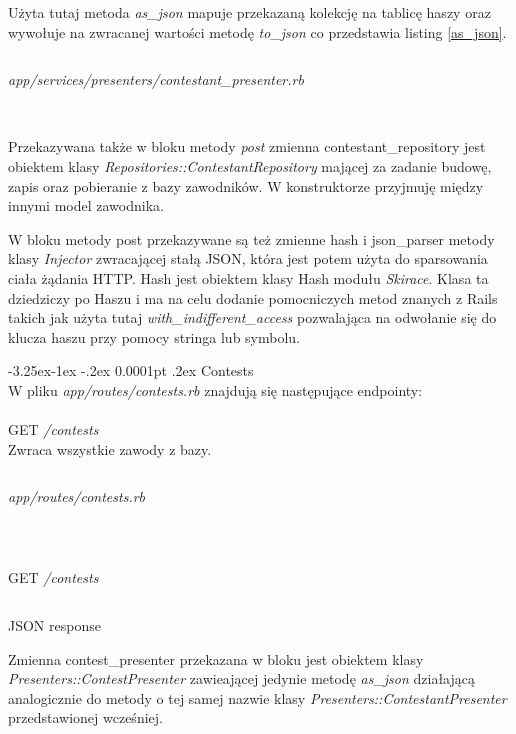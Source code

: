 \documentclass[11pt,a4paper, twoside]{article}
\makeatletter
\renewcommand\subparagraph{\@startsection{subparagraph}{5}{\z@}%
                                     {-3.25ex\@plus -1ex \@minus -.2ex}%
                                     {0.0001pt \@plus .2ex}%
                                     {\normalfont\normalsize\bfseries}}
\makeatother
\begin{document}
Użyta tutaj metoda \emph{as\_json} mapuje przekazaną kolekcję na tablicę haszy oraz wywołuje na zwracanej wartości metodę \emph{to\_json} co przedstawia listing \ref{as_json}.
\begin{listing}
\inputminted{ruby}{./src/contestants_as_json.rb}
\caption{\emph{app/services/presenters/contestant\_presenter.rb}}
$\label{as_json}$
\end{listing}


Przekazywana także w bloku metody \emph{post} zmienna contestant\_repository jest obiektem klasy \emph{Repositories::ContestantRepository} mającej za zadanie budowę, zapis oraz pobieranie z bazy zawodników. W konstruktorze przyjmuję między innymi model zawodnika. %

W bloku metody post przekazywane są też zmienne hash i json\_parser metody klasy \emph{Injector} zwracającej stałą JSON, która jest potem użyta do sparsowania ciała żądania HTTP. Hash jest obiektem klasy Hash modułu \emph{Skirace}. Klasa ta dziedziczy po Haszu i ma na celu dodanie pomocniczych metod znanych z Rails takich jak użyta tutaj \emph{with\_indifferent\_access} pozwalająca na odwołanie się do klucza haszu przy pomocy stringa lub symbolu. 

\clearpage
\subparagraph{Contests} ~\\
W pliku \emph{app/routes/contests.rb} znajdują się następujące endpointy:
\\\\
GET \emph{/contests}
\\
\noindent
Zwraca wszystkie zawody z bazy.
\begin{listing}
\inputminted{ruby}{./src/get_contests.rb}
\caption{\emph{app/routes/contests.rb}}
$\label{contests}$
\end{listing}
\begin{listing}
\inputminted{ruby}{./src/curl_contests}
\caption{GET \emph{/contests}}
\end{listing}
\begin{listing}
\inputminted{ruby}{./src/curl_contests_resp}
\caption{JSON response}
\end{listing}
Zmienna contest\_presenter przekazana w bloku jest obiektem klasy \emph{Presenters::ContestPresenter} zawieającej jedynie metodę \emph{as\_json} działającą analogicznie do metody o tej samej nazwie klasy \emph{Presenters::ContestantPresenter} przedstawionej wcześniej.
\end{document}
